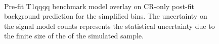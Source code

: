 \begin{figure}[!h]
    \centering
     \\
    \caption{
        Pre-fit T1qqqq benchmark model overlay on CR-only post-fit
        background prediction for the simplified bins. The uncertainty on
        the signal model counts represents the statistical uncertainty due
        to the finite size of the of the simulated sample.
    }
    \label{fig:T1qqqq_MR_simp}
\end{figure}

